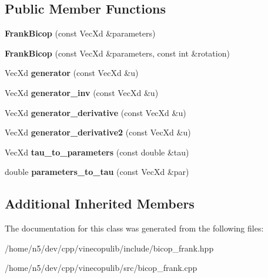 \subsection*{Public Member Functions}
\begin{DoxyCompactItemize}
\item 
{\bfseries Frank\+Bicop} (const Vec\+Xd \&parameters)\hypertarget{class_frank_bicop_ae019221e15eba598f29d9120ac6d1f5c}{}\label{class_frank_bicop_ae019221e15eba598f29d9120ac6d1f5c}

\item 
{\bfseries Frank\+Bicop} (const Vec\+Xd \&parameters, const int \&rotation)\hypertarget{class_frank_bicop_af789907cefc0049b2ce6ea4596195d48}{}\label{class_frank_bicop_af789907cefc0049b2ce6ea4596195d48}

\item 
Vec\+Xd {\bfseries generator} (const Vec\+Xd \&u)\hypertarget{class_frank_bicop_aac20b71ec67ea5067c5342c085a0e306}{}\label{class_frank_bicop_aac20b71ec67ea5067c5342c085a0e306}

\item 
Vec\+Xd {\bfseries generator\+\_\+inv} (const Vec\+Xd \&u)\hypertarget{class_frank_bicop_a3e433ca2c858e95c11896d2d6a445648}{}\label{class_frank_bicop_a3e433ca2c858e95c11896d2d6a445648}

\item 
Vec\+Xd {\bfseries generator\+\_\+derivative} (const Vec\+Xd \&u)\hypertarget{class_frank_bicop_a19d2a80d449caa48d75690be81c2db02}{}\label{class_frank_bicop_a19d2a80d449caa48d75690be81c2db02}

\item 
Vec\+Xd {\bfseries generator\+\_\+derivative2} (const Vec\+Xd \&u)\hypertarget{class_frank_bicop_a07d9488138a598fa9aa770da2153f269}{}\label{class_frank_bicop_a07d9488138a598fa9aa770da2153f269}

\item 
Vec\+Xd {\bfseries tau\+\_\+to\+\_\+parameters} (const double \&tau)\hypertarget{class_frank_bicop_ad4c350e726aa9ca7682d77c3e4e6ed3c}{}\label{class_frank_bicop_ad4c350e726aa9ca7682d77c3e4e6ed3c}

\item 
double {\bfseries parameters\+\_\+to\+\_\+tau} (const Vec\+Xd \&par)\hypertarget{class_frank_bicop_a59f4a4bbe5eb724d18091c2cd379e268}{}\label{class_frank_bicop_a59f4a4bbe5eb724d18091c2cd379e268}

\end{DoxyCompactItemize}
\subsection*{Additional Inherited Members}


The documentation for this class was generated from the following files\+:\begin{DoxyCompactItemize}
\item 
/home/n5/dev/cpp/vinecopulib/include/bicop\+\_\+frank.\+hpp\item 
/home/n5/dev/cpp/vinecopulib/src/bicop\+\_\+frank.\+cpp\end{DoxyCompactItemize}
